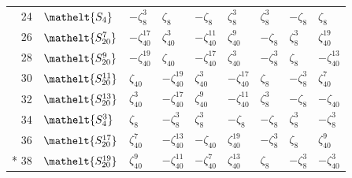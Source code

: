 \documentclass[10pt,a4paper]{article}
\numberwithin{equation}{section}
\newcommand{\eltfont}[1]{{\let\sigma\eltsigma\mathelt{#1}}}
\newcommand{\cls}[1]{\eltfont{#1}}
\newcommand{\rootunity}[1]{\zeta_{#1}}
\begin{document}
{\begin{longtable}{@{}rllllllll@{}}
24 & $\cls{S_{4}}$ & $-\rootunity{8}^{3}$ & $\rootunity{8}$ & $-\rootunity{8}$ & $\rootunity{8}^{3}$ & $\rootunity{8}^{3}$ & $-\rootunity{8}$ & $\rootunity{8}$\\
26 & $\cls{S_{20}^{7}}$ & $-\rootunity{40}^{17}$ & $\rootunity{40}^{3}$ & $-\rootunity{40}^{11}$ & $\rootunity{40}^{9}$ & $-\rootunity{8}$ & $\rootunity{8}^{3}$ & $\rootunity{40}^{19}$\\
28 & $\cls{S_{20}^{9}}$ & $-\rootunity{40}^{19}$ & $\rootunity{40}$ & $-\rootunity{40}^{17}$ & $\rootunity{40}^{3}$ & $-\rootunity{8}^{3}$ & $\rootunity{8}$ & $-\rootunity{40}^{13}$\\
30 & $\cls{S_{20}^{11}}$ & $\rootunity{40}$ & $-\rootunity{40}^{19}$ & $\rootunity{40}^{3}$ & $-\rootunity{40}^{17}$ & $\rootunity{8}$ & $-\rootunity{8}^{3}$ & $\rootunity{40}^{7}$\\
32 & $\cls{S_{20}^{13}}$ & $\rootunity{40}^{3}$ & $-\rootunity{40}^{17}$ & $\rootunity{40}^{9}$ & $-\rootunity{40}^{11}$ & $\rootunity{8}^{3}$ & $-\rootunity{8}$ & $-\rootunity{40}$\\
34 & $\cls{S_{4}^{3}}$ & $\rootunity{8}$ & $-\rootunity{8}^{3}$ & $\rootunity{8}^{3}$ & $-\rootunity{8}$ & $-\rootunity{8}$ & $\rootunity{8}^{3}$ & $-\rootunity{8}^{3}$\\
36 & $\cls{S_{20}^{17}}$ & $\rootunity{40}^{7}$ & $-\rootunity{40}^{13}$ & $-\rootunity{40}$ & $\rootunity{40}^{19}$ & $-\rootunity{8}^{3}$ & $\rootunity{8}$ & $\rootunity{40}^{9}$\\*
38 & $\cls{S_{20}^{19}}$ & $\rootunity{40}^{9}$ & $-\rootunity{40}^{11}$ & $-\rootunity{40}^{7}$ & $\rootunity{40}^{13}$ & $\rootunity{8}$ & $-\rootunity{8}^{3}$ & $-\rootunity{40}^{3}$\\
\bottomrule\end{longtable}}
\end{document}

